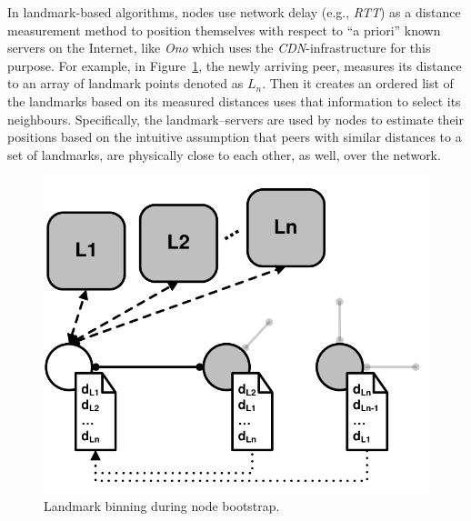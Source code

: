 In landmark-based algorithms, nodes use network delay (e.g., \emph{RTT}) as a
distance measurement method to position themselves with respect to ``a priori''
known servers on the Internet, like \emph{Ono} which uses the \emph{CDN}-infrastructure
for this purpose.
For example, in Figure~\ref{figure:landmarking}, the newly
arriving peer, measures its distance to an array of landmark points denoted as
$L_n$. Then it creates an ordered list of the landmarks based on its measured
distances uses that information to select its neighbours. Specifically,
the landmark--servers are used by nodes to estimate 
their positions based on the intuitive assumption that peers
with similar distances to a set of landmarks, are physically close to each
other, as well, over the network.  
\begin{figure}[ht]
\centering
  \includegraphics[scale=0.34]{img/pdf/landmarking.pdf}
\caption{Landmark binning during node bootstrap.}
\label{figure:landmarking}
\end{figure}




